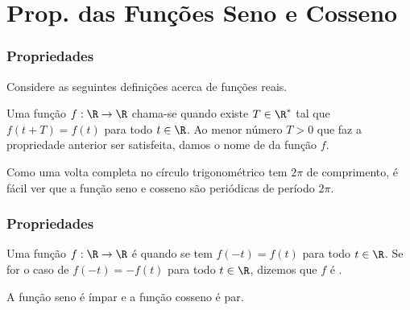 \section{Prop. das Funções Seno e Cosseno}
\begin{frame}
\frametitle{Propriedades} 


Considere as seguintes definições acerca de funções reais.

\begin{definicao}
Uma função $f: \R \to \R$ chama-se  quando existe $T
\in \R^\ast$ tal que $f(t + T) = f(t)$ para todo $t \in \R$. Ao
menor número $T>0$ que faz a propriedade anterior ser satisfeita,
damos o nome de  da função $f$.
\end{definicao}\pause
Como uma volta completa no círculo trigonométrico tem $2 \pi$ de
comprimento, é fácil ver que a função seno e cosseno são periódicas
de período $2\pi$.
\end{frame}

\begin{frame}
\frametitle{Propriedades} 

\begin{definicao}
Uma função $f: \R \to \R$ é  quando se tem $f(-t) = f(t)$
para todo $t\in \R$. Se for o caso de $f(-t) = - f(t)$ para todo $t
\in \R$, dizemos que $f$ é .
\end{definicao}\pause

\begin{proposicao}
A função seno é ímpar e a função cosseno é par.
\end{proposicao}




\end{frame}

